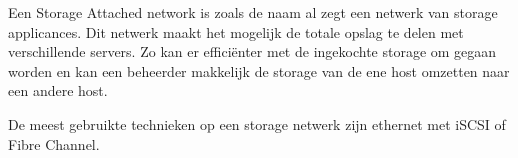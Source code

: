 Een Storage Attached network is zoals de naam al zegt een netwerk van storage applicances. Dit netwerk maakt het mogelijk de totale opslag te delen met verschillende servers. Zo kan er effici\"enter met de ingekochte storage om gegaan worden en kan een beheerder makkelijk de storage van de ene host omzetten naar een andere host.

De meest gebruikte technieken op een storage netwerk zijn ethernet met iSCSI of Fibre Channel.
